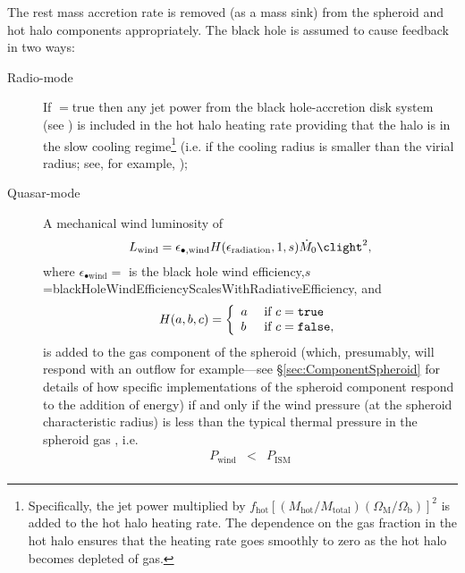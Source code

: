 The rest mass accretion rate is removed (as a mass sink) from the spheroid and hot halo components appropriately. The black hole is assumed to cause feedback in two ways:
\begin{description}
 \item [Radio-mode] If {\normalfont \ttfamily [blackHoleHeatsHotHalo]}$=${\normalfont \ttfamily true} then any jet power from the black hole-accretion disk system (see ) is included in the hot halo heating rate providing that the halo is in the slow cooling regime\footnote{Specifically, the jet power multiplied by $f_\mathrm{hot} [(M_\mathrm{hot}/M_\mathrm{total}) (\Omega_\mathrm{M}/\Omega_\mathrm{b})]^2$ is added to the hot halo heating rate. The dependence on the gas fraction in the hot halo ensures that the heating rate goes smoothly to zero as the hot halo becomes depleted of gas.} (i.e. if the cooling radius is smaller than the virial radius; see, for example, \citealt{benson_cold_2010});
 \item [Quasar-mode] A mechanical wind luminosity of \citep{ostriker_momentum_2010}
\begin{equation}
 L_\mathrm{wind} = \epsilon_{\bullet, \mathrm{wind}} H(\epsilon_\mathrm{radiation},1,s) \dot{M}_0 \clight^2,
\end{equation}
where $\epsilon_{\bullet \mathrm{wind}}=${\normalfont \ttfamily [blackHoleWindEfficiency]} is the black hole wind efficiency,\newline $s$={\normalfont \ttfamily blackHoleWindEfficiencyScalesWithRadiativeEfficiency}, and
\begin{equation}
H(a,b,c) = \left\{\begin{array}{ll}a & \hbox{ if } c=\hbox{\normalfont \ttfamily true} \\b & \hbox{ if } c=\hbox{\normalfont \ttfamily false},\end{array}\right.
\end{equation}
is added to the gas \gls{component} of the spheroid (which, presumably, will respond with an outflow for example---see \S\ref{sec:ComponentSpheroid} for details of how specific implementations of the spheroid component respond to the addition of energy) if and only if the wind pressure (at the spheroid characteristic radius) is less than the typical thermal pressure in the spheroid gas \citep{ciotti_feedbackcentral_2009}, i.e.
\begin{eqnarray}
 P_\mathrm{wind} &<& P_\mathrm{ISM} \nonumber \\

\end{eqnarray}
\end{description}
